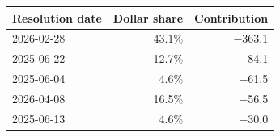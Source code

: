 \begin{tabular}{lrr}
\toprule
Resolution date & Dollar share & Contribution \\
\midrule
2026-02-28 & 43.1\% & \ensuremath{-}363.1 \\
2025-06-22 & 12.7\% & \ensuremath{-}84.1 \\
2025-06-04 & 4.6\% & \ensuremath{-}61.5 \\
2026-04-08 & 16.5\% & \ensuremath{-}56.5 \\
2025-06-13 & 4.6\% & \ensuremath{-}30.0 \\
\bottomrule
\end{tabular}
